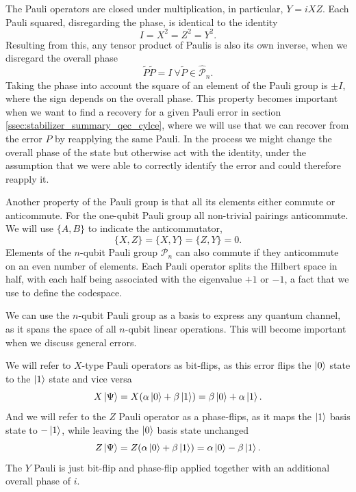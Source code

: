 The Pauli operators are closed under multiplication, in particular, $Y = i X Z$.
Each Pauli squared, disregarding the phase, is identical to the identity
\begin{equation}
    I = X^2 = Z^2 = Y^2.
\end{equation} 
Resulting from this, any tensor product of Paulis is also its own inverse, when we disregard the overall phase
\begin{equation}
    \tilde{P} \tilde{P} = I \ \forall \tilde{P} \in \hat{\mathcal{P}}_n.
    \label{eq:pauli_squared_is_identity}
\end{equation}
Taking the phase into account the square of an element of the Pauli group is $\pm I $, where the sign depends on the overall phase.  
This property becomes important when we want to find a recovery for a given Pauli error in section \ref{ssec:stabilizer_summary_qec_cylce}, 
where we will use that we can recover from the error $P$ by reapplying the same Pauli. 
In the process we might change the overall phase of the state but otherwise act with the identity, 
under the assumption that we were able to correctly identify the error and could therefore reapply it.

Another property of the Pauli group is that all its elements either commute or anticommute.
For the one-qubit Pauli group all non-trivial pairings anticommute. We will use $\{A,B\}$ to indicate the anticommutator, 
\begin{equation}
    \{X,Z\} = \{X,Y\} = \{Z,Y\} = 0.
\end{equation} 
Elements of the $n$-qubit Pauli group $\mathcal{P}_n$ can also commute if they anticommute on an even number of elements. 
Each Pauli operator splits the Hilbert space in half, with each half being associated with the eigenvalue $+1$ or $-1$,
a fact that we use to define the codespace.

We can use the $n$-qubit Pauli group as a basis to express any quantum channel, 
as it spans the space of all $n$-qubit linear operations.
This will become important when we discuss general errors.

We will refer to $X$-type Pauli operators as bit-flips, as this error flips the $\ket{0}$ state to the $\ket{1}$ state and vice versa 
\begin{equation}
    X \ket{\Psi} = X(\alpha \ket{0} + \beta \ket{1}) = \beta \ket{0} + \alpha \ket{1}.
\end{equation}
And we will refer to the $Z$ Pauli operator as a phase-flips, as it maps the $\ket{1}$ basis state to $-\ket{1}$, while leaving the $\ket{0}$ basis state unchanged
\begin{equation}
    Z \ket{\Psi} = Z(\alpha \ket{0} + \beta \ket{1}) = \alpha \ket{0} - \beta \ket{1}.
\end{equation}
The $Y$ Pauli is just bit-flip and phase-flip applied together with an additional overall phase of $i$.

